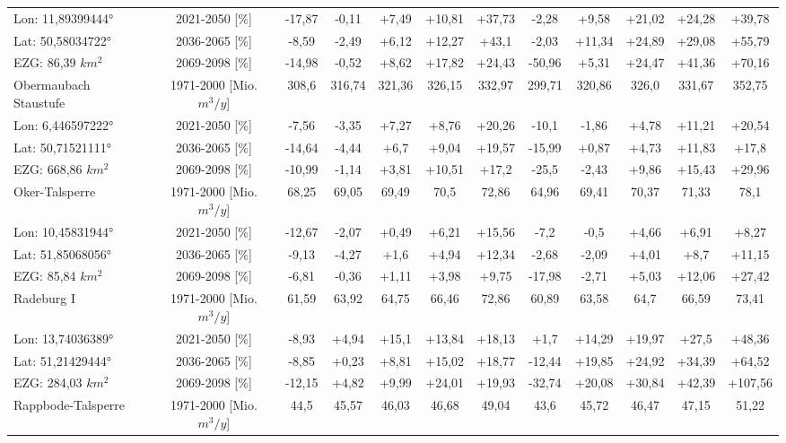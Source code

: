 \begin{longtable}{@{\extracolsep{\fill}}lc|ccccc||ccccc}
\cline{2-12} 
Lon: 11,89399444° & 2021-2050 [\%]  & -17,87 & -0,11 & +7,49 & +10,81 & +37,73 & -2,28 & +9,58 & +21,02 & +24,28 & +39,78\\ 
Lat: 50,58034722° & 2036-2065 [\%]  & -8,59 & -2,49 & +6,12 & +12,27 & +43,1 & -2,03 & +11,34 & +24,89 & +29,08 & +55,79\\ 
EZG: 86,39 $km^2$ & 2069-2098 [\%]  & -14,98 & -0,52 & +8,62 & +17,82 & +24,43 & -50,96 & +5,31 & +24,47 & +41,36 & +70,16\\ 
\hline 
Obermaubach Staustufe & 1971-2000 [Mio. $m^3/y$]  & 308,6 & 316,74 & 321,36 & 326,15 & 332,97 & 299,71 & 320,86 & 326,0 & 331,67 & 352,75\\ 
\cline{2-12} 
Lon: 6,446597222° & 2021-2050 [\%]  & -7,56 & -3,35 & +7,27 & +8,76 & +20,26 & -10,1 & -1,86 & +4,78 & +11,21 & +20,54\\ 
Lat: 50,71521111° & 2036-2065 [\%]  & -14,64 & -4,44 & +6,7 & +9,04 & +19,57 & -15,99 & +0,87 & +4,73 & +11,83 & +17,8\\ 
EZG: 668,86 $km^2$ & 2069-2098 [\%]  & -10,99 & -1,14 & +3,81 & +10,51 & +17,2 & -25,5 & -2,43 & +9,86 & +15,43 & +29,96\\ 
\hline 
Oker-Talsperre & 1971-2000 [Mio. $m^3/y$]  & 68,25 & 69,05 & 69,49 & 70,5 & 72,86 & 64,96 & 69,41 & 70,37 & 71,33 & 78,1\\ 
\cline{2-12} 
Lon: 10,45831944° & 2021-2050 [\%]  & -12,67 & -2,07 & +0,49 & +6,21 & +15,56 & -7,2 & -0,5 & +4,66 & +6,91 & +8,27\\ 
Lat: 51,85068056° & 2036-2065 [\%]  & -9,13 & -4,27 & +1,6 & +4,94 & +12,34 & -2,68 & -2,09 & +4,01 & +8,7 & +11,15\\ 
EZG: 85,84 $km^2$ & 2069-2098 [\%]  & -6,81 & -0,36 & +1,11 & +3,98 & +9,75 & -17,98 & -2,71 & +5,03 & +12,06 & +27,42\\ 
\hline 
Radeburg I & 1971-2000 [Mio. $m^3/y$]  & 61,59 & 63,92 & 64,75 & 66,46 & 72,86 & 60,89 & 63,58 & 64,7 & 66,59 & 73,41\\ 
\cline{2-12} 
Lon: 13,74036389° & 2021-2050 [\%]  & -8,93 & +4,94 & +15,1 & +13,84 & +18,13 & +1,7 & +14,29 & +19,97 & +27,5 & +48,36\\ 
Lat: 51,21429444° & 2036-2065 [\%]  & -8,85 & +0,23 & +8,81 & +15,02 & +18,77 & -12,44 & +19,85 & +24,92 & +34,39 & +64,52\\ 
EZG: 284,03 $km^2$ & 2069-2098 [\%]  & -12,15 & +4,82 & +9,99 & +24,01 & +19,93 & -32,74 & +20,08 & +30,84 & +42,39 & +107,56\\ 
\hline 
Rappbode-Talsperre & 1971-2000 [Mio. $m^3/y$]  & 44,5 & 45,57 & 46,03 & 46,68 & 49,04 & 43,6 & 45,72 & 46,47 & 47,15 & 51,22\\ 

\end{longtable}

